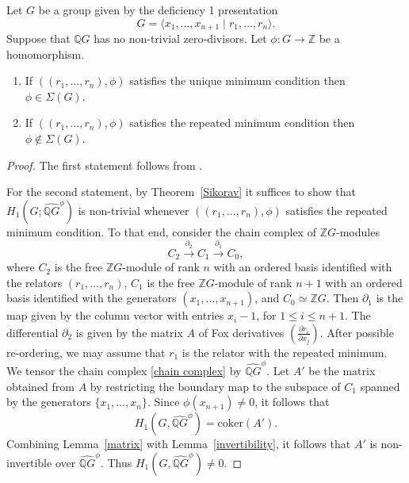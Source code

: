 \begin{lemma}\label{sigma invariant}
Let $G$ be a group given by the deficiency 1 presentation
\[G = \langle x_1, \ldots, x_{n+1} \mid r_1, \ldots, r_n \rangle.\] Suppose that $\mathbb{Q}G$ has no non-trivial zero-divisors. Let $\phi \colon G \to \mathbb{Z}$ be a homomorphism. \begin{enumerate}
    \item If $((r_1, \ldots, r_n),\phi)$ satisfies the unique minimum condition then $\phi \in \Sigma(G)$.
    \item If $((r_1, \ldots, r_n),\phi)$ satisfies the repeated minimum condition then $\phi \not \in \Sigma(G)$.
\end{enumerate} 
\end{lemma}

\begin{proof}
The first statement follows from \cite[Theorem~3.4]{KKW}.

For the second statement, by Theorem~\ref{Sikorav} it suffices to show that $H_1(G; \widehat{\mathbb{Q}G}^{\phi})$ is non-trivial whenever $((r_1, \ldots, r_n), \phi)$ satisfies the repeated minimum condition. To that end, consider the chain complex of $\mathbb{Z}G$-modules
\begin{equation}\label{chain complex}C_2 \xrightarrow{\partial_2} C_1 \xrightarrow{\partial_1} C_0,\end{equation}
where $C_2$ is the free $\mathbb{Z}G$-module of rank $n$ with an ordered basis identified with the relators $(r_1, \ldots, r_n)$, $C_1$ is the free $\mathbb{Z}G$-module of rank $n+1$ with an ordered basis identified with the generators $(x_1, \ldots, x_{n+1})$, and $C_0 \simeq \mathbb{Z}G$. Then $\partial_1$ is the map given by the column vector with entries $x_i - 1$, for $1 \leq i \leq n+1$. The differential $\partial_2$ is given by the matrix $A$ of Fox derivatives $\left(\frac{\partial r_i}{\partial x_j} \right)$. After possible re-ordering, we may assume that $r_1$ is the relator with the repeated minimum. We tensor the chain complex \eqref{chain complex} by $\widehat{\mathbb{Q}G}^{\phi}$. Let $A'$ be the matrix obtained from $A$ by restricting the boundary map to the subspace of $C_1$ spanned by the generators $\{x_1, \ldots, x_n\}$. Since $\phi(x_{n+1}) \neq 0$, it follows that
\[H_1(G, \widehat{\mathbb{Q}G}^{\phi}) = \mathrm{coker}(A').\] Combining Lemma~\ref{matrix} with Lemma~\ref{invertibility}, it follows that $A'$ is non-invertible over $\widehat{\mathbb{Q}G}^{\phi}$. Thus $H_1(G, \widehat{\mathbb{Q}G}^{\phi}) \neq 0$. \end{proof}

